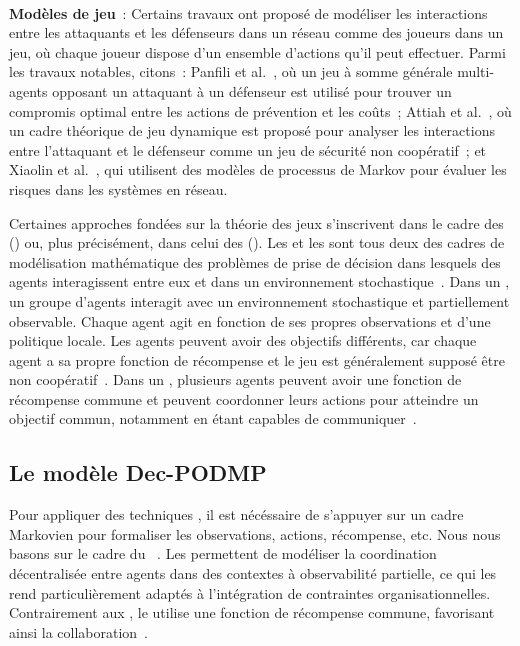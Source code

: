 \

\noindent
\textbf{Modèles de jeu}~: \quad Certains travaux ont proposé de modéliser les interactions entre les attaquants et les défenseurs dans un réseau comme des joueurs dans un jeu, où chaque joueur dispose d'un ensemble d'actions qu'il peut effectuer.
Parmi les travaux notables, citons~: Panfili et al.~\cite{MPanfili2018}, où un jeu à somme générale multi-agents opposant un attaquant à un défenseur est utilisé pour trouver un compromis optimal entre les actions de prévention et les coûts~; Attiah et al.~\cite{AAttiah2018}, où un cadre théorique de jeu dynamique est proposé pour analyser les interactions entre l'attaquant et le défenseur comme un jeu de sécurité non coopératif~; et Xiaolin et al.~\cite{CXiaolin2008}, qui utilisent des modèles de processus de Markov pour évaluer les risques dans les systèmes en réseau.

\noindent
Certaines approches fondées sur la théorie des jeux s'inscrivent dans le cadre des  () ou, plus précisément, dans celui des  (). Les  et les  sont tous deux des cadres de modélisation mathématique des problèmes de prise de décision dans lesquels des agents interagissent entre eux et dans un environnement stochastique~\cite{beynier2010}. Dans un , un groupe d'agents interagit avec un environnement stochastique et partiellement observable. Chaque agent agit en fonction de ses propres observations et d'une politique locale. Les agents peuvent avoir des objectifs différents, car chaque agent a sa propre fonction de récompense et le jeu est généralement supposé être non coopératif~\cite{terry2020pettingzoo}. Dans un , plusieurs agents peuvent avoir une fonction de récompense commune et peuvent coordonner leurs actions pour atteindre un objectif commun, notamment en étant capables de communiquer~\cite{bernstein2013}.



\subsection{Le modèle Dec-PODMP}

Pour appliquer des techniques , il est nécéssaire de s'appuyer sur un cadre Markovien pour formaliser les observations, actions, récompense, etc. Nous nous basons sur le cadre du ~\cite{Oliehoek2016}. Les  permettent de modéliser la coordination décentralisée entre agents dans des contextes à observabilité partielle, ce qui les rend particulièrement adaptés à l'intégration de contraintes organisationnelles. Contrairement aux , le  utilise une fonction de récompense commune, favorisant ainsi la collaboration~\cite{Beynier2013}.

